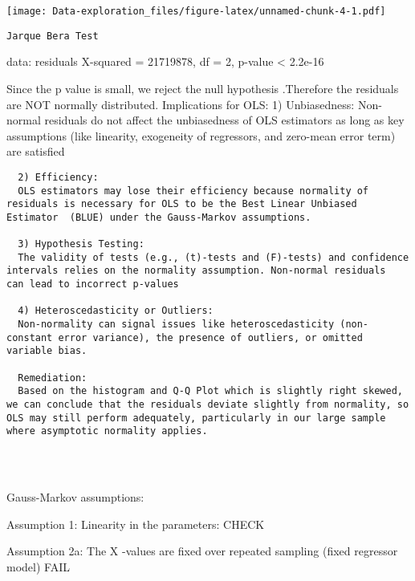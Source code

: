\documentclass[
]{article}
\begin{document}
\texttt{[image: Data-exploration\_files/figure-latex/unnamed-chunk-4-1.pdf]}

\begin{verbatim}
Jarque Bera Test
\end{verbatim}

data: residuals X-squared = 21719878, df = 2, p-value \textless{}
2.2e-16

Since the p value is small, we reject the null hypothesis .Therefore the
residuals are NOT normally distributed. Implications for OLS: 1)
Unbiasedness: Non-normal residuals do not affect the unbiasedness of OLS
estimators as long as key assumptions (like linearity, exogeneity of
regressors, and zero-mean error term) are satisfied

\begin{verbatim}
  2) Efficiency:
  OLS estimators may lose their efficiency because normality of residuals is necessary for OLS to be the Best Linear Unbiased Estimator  (BLUE) under the Gauss-Markov assumptions.
  
  3) Hypothesis Testing:
  The validity of tests (e.g., (t)-tests and (F)-tests) and confidence intervals relies on the normality assumption. Non-normal residuals         can lead to incorrect p-values
  
  4) Heteroscedasticity or Outliers:
  Non-normality can signal issues like heteroscedasticity (non-constant error variance), the presence of outliers, or omitted variable bias. 
  
  Remediation:
  Based on the histogram and Q-Q Plot which is slightly right skewed, we can conclude that the residuals deviate slightly from normality, so OLS may still perform adequately, particularly in our large sample where asymptotic normality applies.
  
  
  
\end{verbatim}

Gauss-Markov assumptions:

Assumption 1: Linearity in the parameters: CHECK

Assumption 2a: The X -values are fixed over repeated sampling (fixed
regressor model) FAIL
\end{document}
